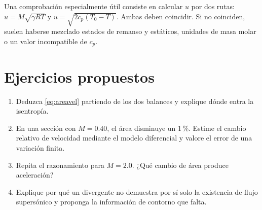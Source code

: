 Una comprobación especialmente útil consiste en calcular $u$ por dos rutas: $u=M\sqrt{\gamma RT}$ y $u=\sqrt{2c_p(T_0-T)}$. Ambas deben coincidir. Si no coinciden, suelen haberse mezclado estados de remanso y estáticos, unidades de masa molar o un valor incompatible de $c_p$.
\section{Ejercicios propuestos}
\begin{enumerate}
\item Deduzca \eqref{eq:areavel} partiendo de los dos balances y explique dónde entra la isentropía.
\item En una sección con $M=0.40$, el área disminuye un 1\,\%. Estime el cambio relativo de velocidad mediante el modelo diferencial y valore el error de una variación finita.
\item Repita el razonamiento para $M=2.0$. ¿Qué cambio de área produce aceleración?
\item Explique por qué un divergente no demuestra por sí solo la existencia de flujo supersónico y proponga la información de contorno que falta.
\end{enumerate}
